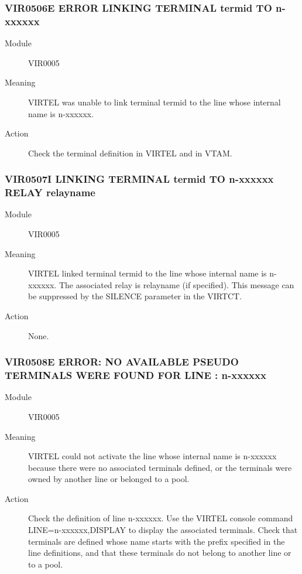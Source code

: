 \documentclass[letterpaper,10pt,english]{sphinxmanual}
\begin{document}
\subsubsection{VIR0506E ERROR LINKING TERMINAL termid TO n-xxxxxx}
\label{\detokenize{messages:vir0506e-error-linking-terminal-termid-to-n-xxxxxx}}\begin{description}
\item[{Module}] \leavevmode
VIR0005

\item[{Meaning}] \leavevmode
VIRTEL was unable to link terminal termid to the line whose internal name is n-xxxxxx.

\item[{Action}] \leavevmode
Check the terminal definition in VIRTEL and in VTAM.

\end{description}


\subsubsection{VIR0507I LINKING TERMINAL termid TO n-xxxxxx RELAY relayname}
\label{\detokenize{messages:vir0507i-linking-terminal-termid-to-n-xxxxxx-relay-relayname}}\begin{description}
\item[{Module}] \leavevmode
VIR0005

\item[{Meaning}] \leavevmode
VIRTEL linked terminal termid to the line whose internal name is n-xxxxxx. The associated relay is relayname (if specified). This message can be suppressed by the SILENCE parameter in the VIRTCT.

\item[{Action}] \leavevmode
None.

\end{description}


\subsubsection{VIR0508E ERROR: NO AVAILABLE PSEUDO TERMINALS WERE FOUND FOR LINE : n-xxxxxx}
\label{\detokenize{messages:vir0508e-error-no-available-pseudo-terminals-were-found-for-line-n-xxxxxx}}\begin{description}
\item[{Module}] \leavevmode
VIR0005

\item[{Meaning}] \leavevmode
VIRTEL could not activate the line whose internal name is n-xxxxxx because there were no associated terminals defined, or the terminals were owned by another line or belonged to a pool.

\item[{Action}] \leavevmode
Check the definition of line n-xxxxxx. Use the VIRTEL console command LINE=n-xxxxxx,DISPLAY to display the associated terminals. Check that terminals are defined whose name starts with the prefix specified in the line definitions, and that these terminals do not belong to another line or to a pool.

\end{description}
\end{document}
